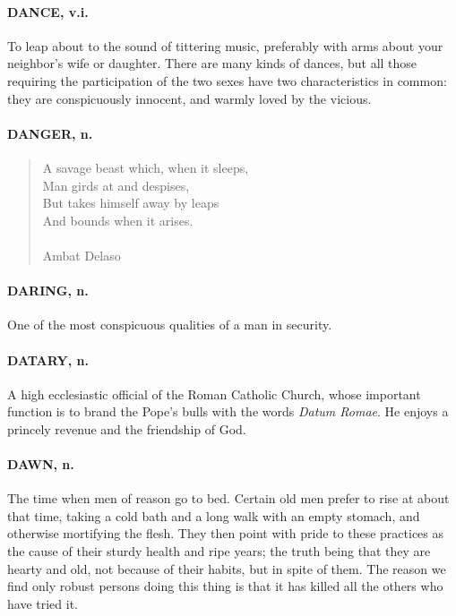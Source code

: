 \documentclass[11pt]{article}
\begin{document}
\paragraph{DANCE, v.i.}  To leap about to the sound of tittering music, preferably
with arms about your neighbor's wife or daughter.  There are many
kinds of dances, but all those requiring the participation of the two
sexes have two characteristics in common:  they are conspicuously
innocent, and warmly loved by the vicious.

\paragraph{DANGER, n.}

\begin{quote}   A savage beast which, when it sleeps, \\
      Man girds at and despises, \\
  But takes himself away by leaps \\
      And bounds when it arises. \\
 \\
Ambat Delaso \end{quote}


\paragraph{DARING, n.}  One of the most conspicuous qualities of a man in
security.

\paragraph{DATARY, n.}  A high ecclesiastic official of the Roman Catholic Church,
whose important function is to brand the Pope's bulls with the words
{\em Datum Romae}.  He enjoys a princely revenue and the friendship of
God.

\paragraph{DAWN, n.}  The time when men of reason go to bed.  Certain old men
prefer to rise at about that time, taking a cold bath and a long walk
with an empty stomach, and otherwise mortifying the flesh.  They then
point with pride to these practices as the cause of their sturdy
health and ripe years; the truth being that they are hearty and old,
not because of their habits, but in spite of them.  The reason we find
only robust persons doing this thing is that it has killed all the
others who have tried it.
\end{document}
